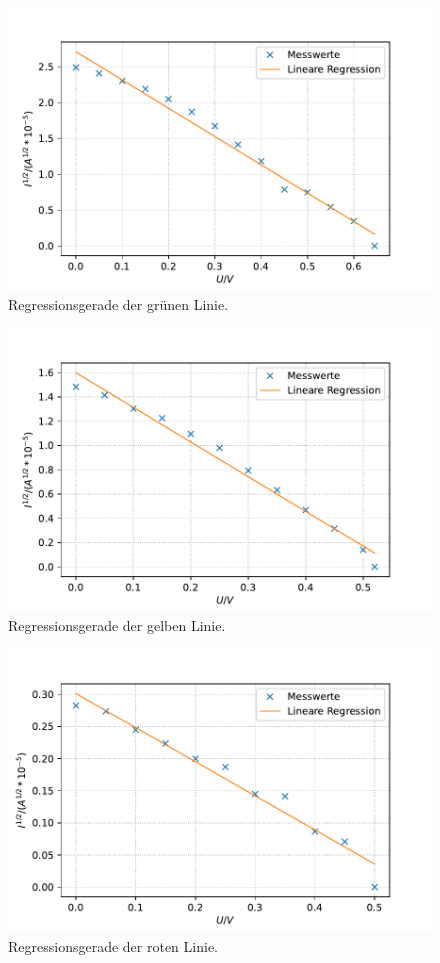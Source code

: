 \begin{figure}
  \center
  \caption{Regressionsgerade der grünen Linie.}\label{fig:spek3}
  \includegraphics[width=0.8\linewidth]{pictures/spek3.pdf}
\end{figure}

\begin{figure}
  \center
  \caption{Regressionsgerade der gelben Linie.}\label{fig:spek4}
  \includegraphics[width=0.8\linewidth]{pictures/spek4.pdf}
\end{figure}

\begin{figure}
  \center
  \caption{Regressionsgerade der roten Linie.}\label{fig:spek5}
  \includegraphics[width=0.8\linewidth]{pictures/spek5.pdf}
\end{figure}

